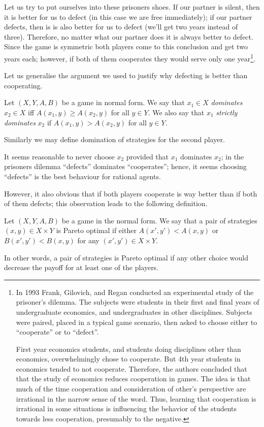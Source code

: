 Let us try to put ourselves into these prisoners shoes. If our partner is silent,
then it is better for us to defect (in this case we are free immediately); if
our partner defects, then is is also better for us to defect (we'll get two
years instead of three). Therefore, no matter what our partner does it is always
better to defect. Since the game is symmetric both players come to this
conclusion and get two years each; however, if both of them cooperates they
would serve only one year\footnote{%
  In 1993 Frank, Gilovich, and Regan conducted an experimental study of the
  prisoner's dilemma. The subjects were students in their first and final years
  of undergraduate economics, and undergraduates in other disciplines. Subjects
  were paired, placed in a typical game scenario, then asked to choose either to
  ``cooperate'' or to ``defect''. 

  First year economics students, and students doing disciplines other than
  economics, overwhelmingly chose to cooperate. But 4th year students in
  economics tended to not cooperate. Therefore, the authors concluded that
  that the study of economics reduces cooperation in games. The idea is
  that much of the time cooperation and consideration of other's perspective are
  irrational in the narrow sense of the word. Thus, learning that cooperation is
  irrational in some situations is influencing the behavior of the students
  towards less cooperation, presumably to the negative.
}.

Let us generalise the argument we used to justify why defecting is better than
cooperating.
\begin{definition}
  Let $(X, Y, A, B)$ be a game in normal form. We say that $x_1 \in X$
  \emph{dominates} $x_2 \in X$ iff $A(x_1, y) \ge A(x_2, y)$ for all $y \in Y$.
  We also say that $x_1$ \emph{strictly dominates} $x_2$ if $A(x_1, y) > A(x_2,
  y)$ for all $y \in Y$.

  Similarly we may define domination of strategies for the second player.
\end{definition}
It seems reasonable to never choose $x_2$ provided that $x_1$ dominates $x_2$; in
the prisoners dilemma ``defects'' dominates ``cooperates''; hence, it seems
choosing ``defects'' is the best behaviour for rational agents.

However, it also obvious that if both players cooperate is way better than if
both of them defects; this observation leads to the following definition.
\begin{definition}
  Let $(X, Y, A, B)$  be a game in the normal form. We say that a pair of
  strategies $(x, y) \in X \times Y$ is Pareto optimal if either 
  $A(x', y') < A(x, y)$ or $B(x', y') < B(x, y)$ for any 
  $(x', y') \in X \times Y$.
\end{definition}
In other words, a pair of strategies is Pareto optimal if any other choice would
decrease the payoff for at least one of the players.

